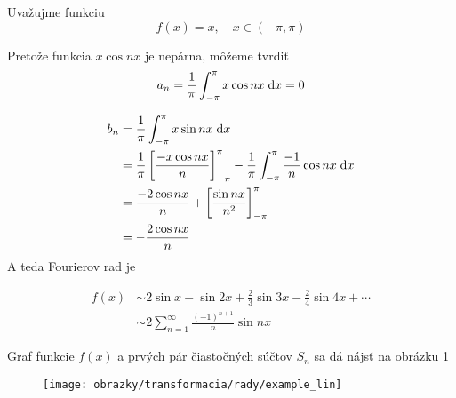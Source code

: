 \begin{priklad}
   Uvažujme funkciu 
   \begin{equation}
        f(x) = x, \quad x \in(-\pi,\pi)
   \end{equation}

    Pretože funkcia $x \cos nx$ je nepárna, môžeme tvrdiť
   \begin{equation}
        a_n = \frac{1}{\pi} \int_{-\pi}^{\pi} x \cos nx \; \mathrm{d} x =0
   \end{equation}

   \begin{equation}
   \begin{split}
        b_n &= \frac{1}{\pi} \int_{-\pi}^{\pi} x \sin nx \; \mathrm{d} x \\
        &= \frac{1}{\pi} \left[
            \frac{- x \cos nx}{n}
            \right]_{-\pi}^\pi -
            \frac{1}{\pi} \int_{-\pi}^{\pi} \frac{-1}{n} \cos nx \; \mathrm{d} x  \\
        &=
        \frac{-2 \cos nx}{n} + 
            \left[
                \frac{\sin nx}{n^2}
            \right]_{-\pi}^{\pi} \\
        &= -\frac{2 \cos nx}{n}
   \end{split}
   \end{equation}
   A teda Fourierov rad je
   
    \begin{equation}
    \begin{split}
        f(x) &\sim 2 \sin x - \sin 2x + \frac{2}{3} \sin 3x - \frac{2}{4}
        \sin 4x + \cdots \\
        &\sim 2\sum_{n=1}^{\infty} \frac{(-1)^{n+1}}{n} \sin nx
    \end{split}
    \end{equation}
    
    Graf funkcie $f(x)$ a prvých pár čiastočných súčtov $S_n$ sa dá
    nájsť na obrázku \ref{fig:example_lin}

    \begin{figure}[htp]
        \centering
        \texttt{[image: obrazky/transformacia/rady/example\_lin]}
        \caption{}
        \label{fig:example_lin}
    \end{figure}
\end{priklad}


